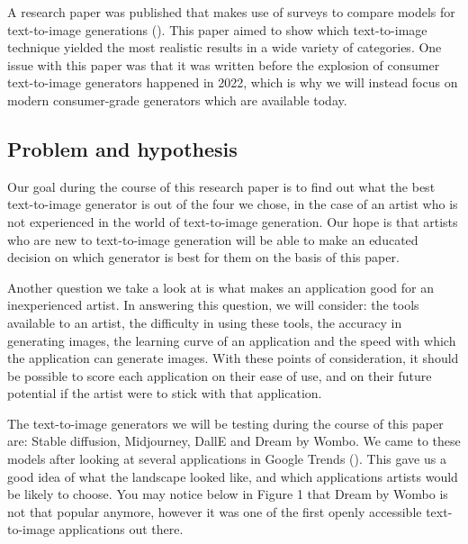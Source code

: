 \documentclass[]{report}
\begin{document}
	A research paper was published that makes use of surveys to compare models for text-to-image generations (\cite{agnese2020survey}). This paper aimed to show which text-to-image technique yielded the most realistic results in a wide variety of categories. One issue with this paper was that it was written before the explosion of consumer text-to-image generators happened in 2022, which is why we will instead focus on modern consumer-grade generators which are available today.
	
	\subsection{Problem and hypothesis}
	Our goal during the course of this research paper is to find out what the best text-to-image generator is out of the four we chose, in the case of an artist who is not experienced in the world of text-to-image generation. Our hope is that artists who are new to text-to-image generation will be able to make an educated decision on which generator is best for them on the basis of this paper.
	
	Another question we take a look at is what makes an application good for an inexperienced artist. In answering this question, we will consider: the tools available to an artist, the difficulty in using these tools, the accuracy in generating images, the learning curve of an application and the speed with which the application can generate images. With these points of consideration, it should be possible to score each application on their ease of use, and on their future potential if the artist were to stick with that application.
	
	The text-to-image generators we will be testing during the course of this paper are: Stable diffusion, Midjourney, DallE and Dream by Wombo. We came to these models after looking at several applications in Google Trends (\cite{googleTrends}). This gave us a good idea of what the landscape looked like, and which applications artists would be likely to choose. You may notice below in Figure 1 that Dream by Wombo is not that popular anymore, however it was one of the first openly accessible text-to-image applications out there.
	
\end{document}
